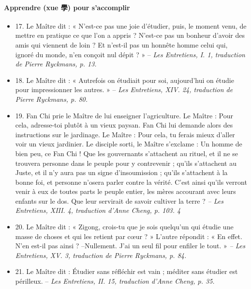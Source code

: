 \paragraph{Apprendre (xue 學) pour s’accomplir   }
\begin{itemize}
    
\item 17. \newline Le Maître dit  : « N’est-ce pas une joie d’étudier, puis, le moment venu, de mettre en pratique ce que l’on a appris ? N’est-ce pas un bonheur d’avoir des amis qui viennent de loin ? Et n’est-il pas un honnête homme celui qui, ignoré du monde, n’en conçoit nul dépit ? » -- \textit{\small Les Entretiens, I. 1, traduction de Pierre Ryckmans, p. 13.  }
\item 18. \newline Le Maître dit : « Autrefois on étudiait pour soi,  aujourd’hui on étudie pour impressionner les autres. » -- \textit{\small Les Entretiens, XIV. 24, traduction de Pierre Ryckmans, p. 80.  }
\item 19. Fan Chi prie  le Maître de lui enseigner l’agriculture. \newline Le Maître : Pour cela, adresse-toi plutôt à un vieux paysan. Fan Chi lui demande alors des instructions sur le jardinage. \newline Le Maître : Pour cela, tu ferais mieux d’aller voir un vieux jardinier.    \newline     Le disciple sorti,  le Maître s’exclame : Un homme de bien peu, ce Fan Chi ! Que les gouvernants s’attachent au rituel, et il ne se trouvera personne dans le peuple pour y contrevenir ; qu’ils s’attachent au Juste, et il n’y aura pas un signe d’insoumission ; qu’ils s’attachent à la bonne foi, et personne n’osera parler contre la vérité. C’est ainsi qu’ils verront venir à eux de toutes parts le peuple entier, les mères accourant avec leurs enfants sur le dos. Que leur servirait de savoir cultiver la terre ? \textit{\small -- Les Entretiens, XIII. 4, traduction d’Anne Cheng, p. 103.    4 }

\item 20. \newline Le Maître dit : « Zigong, crois-tu que je sois quelqu’un qui étudie une masse de choses et qui les retient par cœur ? » \newline L’autre répondit : « En effet. N’en est-il pas ainsi ? \newline –Nullement. J’ai un seul fil pour enfiler le tout. » \textit{\small -- Les Entretiens, XV. 3, traduction de Pierre Ryckmans, p. 84.  }
\item 21. \newline Le Maître dit : Étudier sans réfléchir est vain ; méditer sans étudier est périlleux. -- \textit{\small Les Entretiens, II. 15, traduction d’Anne Cheng, p. 35.   }
\end{itemize}

